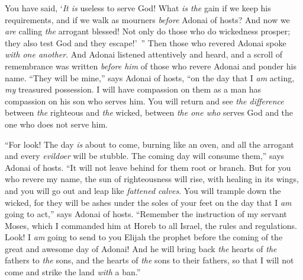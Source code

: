 \begin{biblechapter}
\verse You have said, ‘\textit{It is} useless to serve God! What \textit{is the} gain if we keep his requirements, and if we walk as mourners \textit{before} Adonai of hosts?
\verse And now we \textit{are} calling \textit{the} arrogant blessed! Not only do those who do wickedness prosper; they also test God and they escape!’ ”
 Then those who revered Adonai spoke \textit{with one another}. And Adonai listened attentively and heard, and a scroll of remembrance was written \textit{before him} of those who revere Adonai and ponder his name.
\verse “They will be mine,” says Adonai of hosts, “on the day that I \textit{am} acting, \textit{my} treasured possession. I will have compassion on them as a man has compassion on his son who serves him.
\verse You will return and see \textit{the difference} between \textit{the} righteous and \textit{the} wicked, between \textit{the one who} serves God and the one who does not serve him.
\end{biblechapter}

\begin{biblechapter} %
\verse  “For look! The day \textit{is} about to come, burning like an oven, and all the arrogant and every \textit{evildoer} will be stubble. The coming day will consume them,” says Adonai of hosts. “It will not leave behind for them root or branch.
\verse But for you who revere my name, the sun of righteousness will rise, with healing in its wings, and you will go out and leap like \textit{fattened calves}.
\verse You will trample down the wicked, for they will be ashes under the soles of your feet on the day that I \textit{am} going to act,” says Adonai of hosts.
\verse “Remember the instruction of my servant Moses, which I commanded him at Horeb to all Israel, the rules and regulations.
\verse Look! I \textit{am} going to send to you Elijah the prophet before the coming of the great and awesome day of Adonai!
\verse And he will bring back \textit{the} hearts of \textit{the} fathers to \textit{the} sons, and the hearts of \textit{the} sons to their fathers, so that I will not come and strike the land \textit{with} a ban.”
\end{biblechapter}

